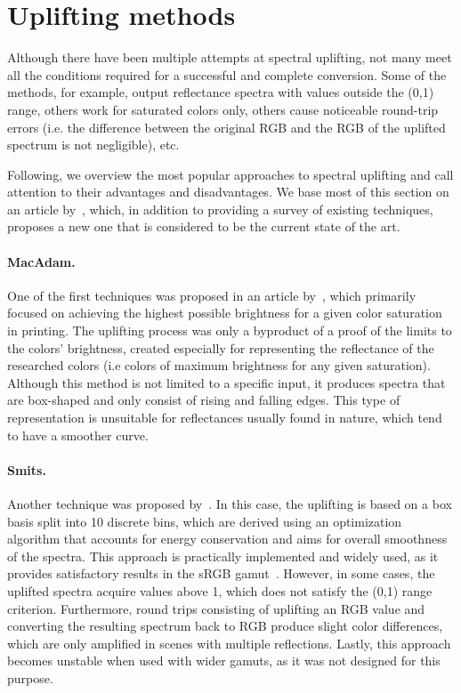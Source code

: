 \section{Uplifting methods} \label{sec:upliftingMethods}

Although there have been multiple attempts at spectral uplifting, not many meet all the conditions required for a successful and complete conversion. Some of the methods, for example, output reflectance spectra with values outside the (0,1) range, others work for saturated colors only, others cause noticeable round-trip errors (i.e. the difference between the original RGB and the RGB of the uplifted spectrum is not negligible), etc.

Following, we overview the most popular approaches to spectral uplifting and call attention to their advantages and disadvantages. We base most of this section on an article by~\citet{upsamplingTechniques}, which, in addition to providing a survey of existing techniques, proposes a new one that is considered to be the current state of the art.

\paragraph{MacAdam.} One of the first techniques was proposed in an article by~\citet{upsamplingMacAdam}, which primarily focused on achieving the highest possible brightness for a given color saturation in printing. The uplifting process was only a byproduct of a proof of the limits to the colors' brightness, created especially for representing the reflectance of the researched colors (i.e colors of maximum brightness for any given saturation). Although this method is not limited to a specific input, it produces spectra that are box-shaped and only consist of rising and falling edges. This type of representation is unsuitable for reflectances usually found in nature, which tend to have a smoother curve.

\paragraph{Smits.} Another technique was proposed by~\citet{upsamplingSmits}. In this case, the uplifting is based on a box basis split into 10 discrete bins, which are derived using an optimization algorithm that accounts for energy conservation and aims for overall smoothness of the spectra. This approach is practically implemented and widely used, as it provides satisfactory results in the sRGB gamut~\cite{upsamplingJakobHanika}. However, in some cases, the uplifted spectra acquire values above 1, which does not satisfy the (0,1) range criterion. Furthermore, round trips consisting of uplifting an RGB value and converting the resulting spectrum back to RGB produce slight color differences, which are only amplified in scenes with multiple reflections. Lastly, this approach becomes unstable when used with wider gamuts, as it was not designed for this purpose.

